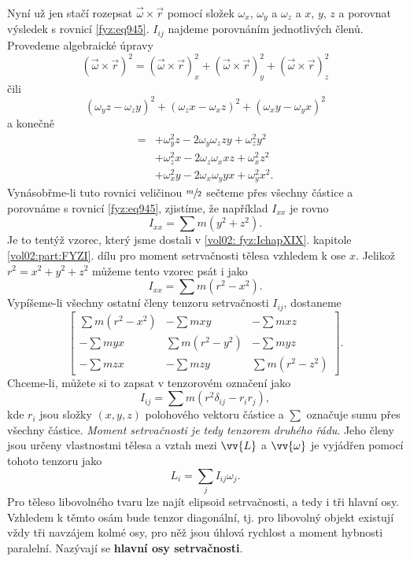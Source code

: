     Nyní už jen stačí rozepsat \(\vec{ω}\times\vec{r}\) pomocí složek \(ω_x\), \(ω_y\) a \(ω_z\) a
    \(x\), \(y\), \(z\) a porovnat výsledek s rovnicí \eqref{fyz:eq945}. \(I_{ij}\) najdeme
    porovnáním jednotlivých členů. Provedeme algebraické úpravy
    \begin{equation*}
      (\vec{ω}×\vec{r})^2=(\vec{ω}×\vec{r})^2_x+(\vec{ω}×\vec{r})^2_y+(\vec{ω}×\vec{r})^2_z
    \end{equation*}
    čili
    \begin{equation*}
      (ω_yz−ω_zy)^2+(ω_zx−ω_xz)^2+(ω_xy−ω_yx)^2
    \end{equation*}
    a konečně
    \begin{align*}
      = &+ω_y^2z − 2ω_yω_z zy + ω_z^2y^2 \\
        &+ω_z^2x − 2ω_zω_x xz + ω_x^2z^2 \\
        &+ω_x^2y − 2ω_xω_y yx + ω_y^2x^2.
    \end{align*}
    Vynásobřme-li tuto rovnici veličinou \(\sfrac{m}{2}\) sečteme přes všechny částice a porovnáme s
    rovnicí \eqref{fyz:eq945}, zjistíme, že například \(I_{xx}\) je rovno
    \begin{equation*}
      I_{xx}=∑m(y^2+z^2).
    \end{equation*}
    Je to tentýž vzorec, který jsme dostali v \ref{vol02: fyz:IchapXIX}. kapitole
    \ref{vol02:part:FYZI}. dílu pro moment setrvačnosti tělesa vzhledem k ose \(x\). Jelikož \(r^2 =
    x^2 + y^2 + z^2\) můžeme tento vzorec psát i jako
    \begin{equation*}
      I_{xx}=∑m(r^2-x^2).
    \end{equation*}
    Vypíšeme-li všechny ostatní členy tenzoru setrvačnosti \(I_{ij}\), dostaneme
    \begin{equation*}
      \begin{bmatrix}
        \sum m(r^2-x^2) &    -\sum mxy     &   -\sum mxz     \\
          -\sum myx     &  \sum m(r^2-y^2) &   -\sum myz     \\
          -\sum mzx     &    -\sum mzy     & \sum m(r^2-z^2)
      \end{bmatrix}.
    \end{equation*}
    Chceme-li, můžete si to zapsat v tenzorovém označení jako
    \begin{equation}\label{fyz:eq949}
      I_{ij}=\sum m(r^2\delta_{ij}-r_ir_j),
    \end{equation}
    kde \(r_i\) jsou složky \((x, y, z)\) polohového vektoru částice a \(\sum\) označuje sumu přes
    všechny částice. \emph{Moment setrvačnosti je tedy tenzorem druhého řádu}. Jeho členy jsou
    určeny vlastnostmi tělesa a vztah mezi \(\vv{L}\) a \(\vv{\omega}\) je vyjádřen pomocí tohoto
    tenzoru jako
    \begin{equation}\label{fyz:eq950}
      L_i=\sum_jI_{ij}\omega_j.
    \end{equation}
    Pro těleso libovolného tvaru lze najít elipsoid setrvačnosti, a tedy i tři hlavní osy. Vzhledem
    k těmto osám bude tenzor diagonální, tj. pro libovolný objekt existují vždy tři navzájem kolmé
    osy, pro něž jsou úhlová rychlost a moment hybnosti paralelní. Nazývají se \textbf{hlavní osy
    setrvačnosti}.

